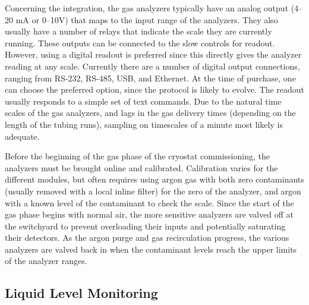 Concerning the integration, the gas analyzers typically have an analog output (\numrange{4}{20} \si{mA} or \numrange{0}{10}\si{V}) that maps to the input range of the analyzers. They also usually have a number of relays that indicate the scale they are currently running. These outputs can be connected to the slow controls for readout. However, using a digital readout is preferred since this directly gives the analyzer reading at any scale. Currently there are a number of digital output connections, ranging from RS-232, RS-485, USB, and Ethernet. At the time of purchase, one can choose the preferred option, since the protocol is likely to evolve. The readout usually responds to a simple set of text commands. Due to the natural time scales of the gas analyzers, and lags in the gas delivery times (depending on the length of the tubing runs), sampling on timescales of a minute most likely is adequate. 

Before the beginning of the gas phase of the cryostat commissioning, the analyzers must be brought online and calibrated. Calibration varies for the different modules, but often requires using argon gas with both zero contaminants (usually removed with a local inline filter) for the zero of the analyzer, and argon with a known level of the contaminant to check the scale. Since the start of the gas phase  begins with normal air, the more sensitive analyzers are valved off at the switchyard to prevent overloading their inputs and potentially saturating their detectors. As the argon purge and gas recirculation progress, the various analyzers are valved back in when the contaminant levels reach the upper limits of the analyzer ranges. 

\subsection{Liquid Level Monitoring}
\label{sec:fdgen-slow-cryo-install-llm}

